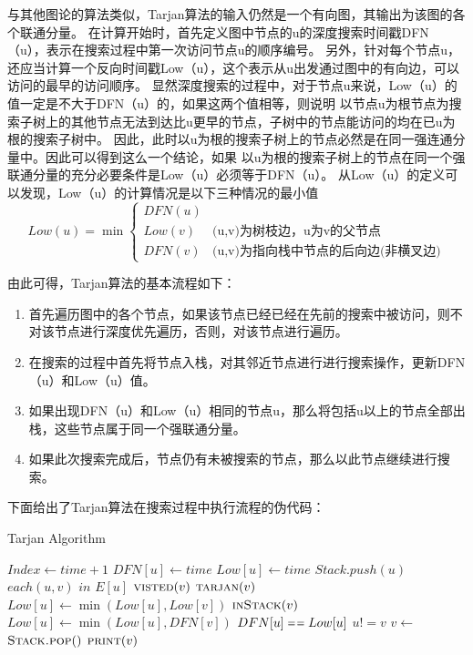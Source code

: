 与其他图论的算法类似，Tarjan算法的输入仍然是一个有向图，其输出为该图的各个联通分量。
在计算开始时，首先定义图中节点的u的深度搜索时间戳DFN（u），表示在搜索过程中第一次访问节点u的顺序编号。
另外，针对每个节点u，还应当计算一个反向时间戳Low（u），这个表示从u出发通过图中的有向边，可以访问的最早的访问顺序。
显然深度搜索的过程中，对于节点u来说，Low（u）的值一定是不大于DFN（u）的，如果这两个值相等，则说明
以节点u为根节点为搜索子树上的其他节点无法到达比u更早的节点，子树中的节点能访问的均在已u为根的搜索子树中。
因此，此时以u为根的搜索子树上的节点必然是在同一强连通分量中。因此可以得到这么一个结论，如果
以u为根的搜索子树上的节点在同一个强联通分量的充分必要条件是Low（u）必须等于DFN（u）。
从Low（u）的定义可以发现，Low（u）的计算情况是以下三种情况的最小值
$$Low(u)=\min
\begin{cases}
DFN(u) & \\
Low(v)& \text{(u,v)为树枝边，u为v的父节点}\\
DFN(v)& \text{(u,v)为指向栈中节点的后向边(非横叉边)}
\end{cases}$$

由此可得，Tarjan算法的基本流程如下：
\begin{enumerate}
\item	首先遍历图中的各个节点，如果该节点已经已经在先前的搜索中被访问，则不对该节点进行深度优先遍历，否则，对该节点进行遍历。
\item	在搜索的过程中首先将节点入栈，对其邻近节点进行进行搜索操作，更新DFN（u）和Low（u）值。
\item	如果出现DFN（u）和Low（u）相同的节点u，那么将包括u以上的节点全部出栈，这些节点属于同一个强联通分量。
\item 	如果此次搜索完成后，节点仍有未被搜索的节点，那么以此节点继续进行搜索。
\end{enumerate}

下面给出了Tarjan算法在搜索过程中执行流程的伪代码：
\begin{algorithm} 
\caption {Tarjan Algorithm} 
\begin{codebox}
\li	$Index \leftarrow time + 1$
\li	$DFN[u] \leftarrow time$
\li	$Low[u] \leftarrow time$
\li	$Stack.push(u)$
\li	\For $each (u, v)$ $in$ $E[u]$
\li		\Do  \If $\textnormal{\scshape visted}(v)$
\li			\Then
				$\textnormal{\scshape tarjan}(v)$                  
\li            			$Low[u] \leftarrow \min(Low[u], Low[v])$
\li        		 \ElseIf $\textnormal{\scshape inStack}(v)$ 
\li            			\Then $Low[u] \leftarrow \min(Low[u], DFN[v])$
			\End
		\End
\li	\If $DFN[u] \isequal Low[u]$
\li		\Then \While $u != v$
\li				\Do $v \leftarrow$ $\textnormal{\scshape Stack.pop}()$                  
\li            				$\textnormal{\scshape print}(v)$
				\End 
		\End
\end{codebox}
\end{algorithm} 

